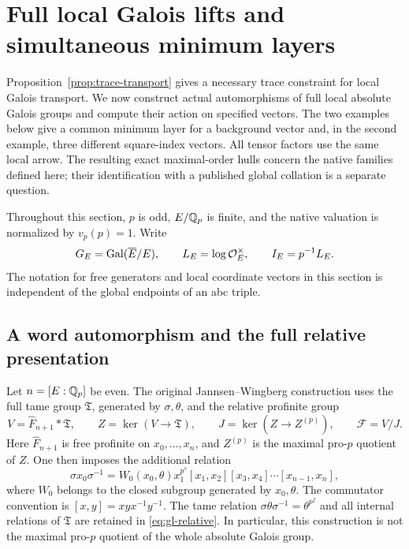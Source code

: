 \section{Full local Galois lifts and simultaneous minimum layers}
\label{sec:full-galois-lifts}

Proposition~\ref{prop:trace-transport} gives a necessary trace constraint
for local Galois transport. We now construct actual automorphisms of full local absolute
Galois groups and compute their action on specified vectors. The two
examples below give a common minimum layer for a background vector and,
in the second example, three different square-index vectors. All tensor
factors use the same local arrow. The resulting exact maximal-order
hulls concern the native families defined here; their identification
with a published global collation is a separate question.

Throughout this section, $p$ is odd, $E/\mathbb Q_p$ is finite, and the native
valuation is normalized by $v_p(p)=1$. Write
\[
 G_E=\operatorname{Gal}(\overline E/E),\qquad
 L_E=\log\mathcal O_E^\times,\qquad I_E=p^{-1}L_E.
\]
The notation for free generators and local coordinate vectors in this
section is independent of the global endpoints of an abc triple.

\subsection{A word automorphism and the full relative presentation}

Let $n=[E:\mathbb Q_p]$ be even. The original Jannsen--Wingberg construction
\cite[\S1.2, Theorem~2, and \S1.4(a), pp.~74--76]{JannsenWingberg}
uses the full tame group $\mathfrak T$, generated by $\sigma,\theta$,
and the relative profinite group
\begin{equation}\label{eq:gl-relative}
 V=\widehat F_{n+1}*\mathfrak T,\qquad
 Z=\ker(V\longrightarrow\mathfrak T),\qquad
 J=\ker(Z\longrightarrow Z^{(p)}),\qquad
 \mathcal F=V/J.
\end{equation}
Here $\widehat F_{n+1}$ is free profinite on $x_0,\ldots,x_n$, and
$Z^{(p)}$ is the maximal pro-$p$ quotient of $Z$. One then imposes
the additional relation
\begin{equation}\label{eq:gl-jw}
 \sigma x_0\sigma^{-1}
 =W_0(x_0,\theta)x_1^{p^s}
    [x_1,x_2][x_3,x_4]\cdots[x_{n-1},x_n],
\end{equation}
where $W_0$ belongs to the closed subgroup generated by $x_0,\theta$.
The commutator convention is $[x,y]=xyx^{-1}y^{-1}$.
The tame relation $\sigma\theta\sigma^{-1}=\theta^{p^f}$ and all
internal relations of $\mathfrak T$ are retained in
\eqref{eq:gl-relative}. In particular, this construction is not the
maximal pro-$p$ quotient of the whole absolute Galois group.

